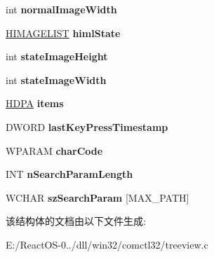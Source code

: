 \begin{DoxyCompactItemize}
int {\bfseries normal\+Image\+Width}
\item 
\mbox{\label{structtag_t_r_e_e_v_i_e_w___i_n_f_o_a36044bf09820cad35433c384e5c61dd3}} 
\hyperlink{struct___i_m_a_g_e_l_i_s_t}{H\+I\+M\+A\+G\+E\+L\+I\+ST} {\bfseries himl\+State}
\item 
\mbox{\label{structtag_t_r_e_e_v_i_e_w___i_n_f_o_a93c6176bd5a463eaa2311cac4e4aa4ba}} 
int {\bfseries state\+Image\+Height}
\item 
\mbox{\label{structtag_t_r_e_e_v_i_e_w___i_n_f_o_a7940e92f482b875431bcb7f3adbd1ada}} 
int {\bfseries state\+Image\+Width}
\item 
\mbox{\label{structtag_t_r_e_e_v_i_e_w___i_n_f_o_aa7d3e939faca93fa77a0e6a6e1bdc247}} 
\hyperlink{struct___d_p_a}{H\+D\+PA} {\bfseries items}
\item 
\mbox{\label{structtag_t_r_e_e_v_i_e_w___i_n_f_o_aa564874017e700bc40cb949c8e594b73}} 
D\+W\+O\+RD {\bfseries last\+Key\+Press\+Timestamp}
\item 
\mbox{\label{structtag_t_r_e_e_v_i_e_w___i_n_f_o_a5e5d1da32d77785d26d1b2a29f41fc00}} 
W\+P\+A\+R\+AM {\bfseries char\+Code}
\item 
\mbox{\label{structtag_t_r_e_e_v_i_e_w___i_n_f_o_a2b594396a9f2a91b5b20f38a7eacfbb2}} 
I\+NT {\bfseries n\+Search\+Param\+Length}
\item 
\mbox{\label{structtag_t_r_e_e_v_i_e_w___i_n_f_o_af5b967bf0f59c85bb3e46299a4586f95}} 
W\+C\+H\+AR {\bfseries sz\+Search\+Param} \mbox{[}M\+A\+X\+\_\+\+P\+A\+TH\mbox{]}
\end{DoxyCompactItemize}


该结构体的文档由以下文件生成\+:\begin{DoxyCompactItemize}
\item 
E\+:/\+React\+O\+S-\/0../dll/win32/comctl32/treeview.\+c\end{DoxyCompactItemize}
